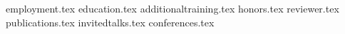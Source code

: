\documentclass[11pt, a4paper]{awesome-cv}
\newcommand*{\sectiondir}{sections/}
\begin{document}
\makecvheader

{employment.tex}
{education.tex}
{additionaltraining.tex}
{honors.tex}
{reviewer.tex}
{publications.tex}
{invitedtalks.tex}
{conferences.tex}
\end{document}
